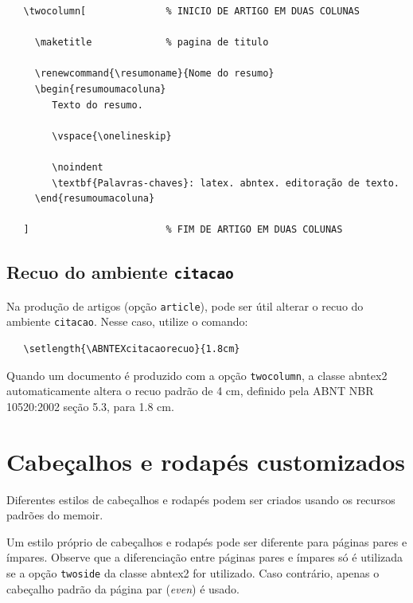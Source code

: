 \documentclass{Article_Class_RevInfor}
\begin{document}
\begin{verbatim}
   \twocolumn[              % INICIO DE ARTIGO EM DUAS COLUNAS

     \maketitle             % pagina de titulo

     \renewcommand{\resumoname}{Nome do resumo}
     \begin{resumoumacoluna}
        Texto do resumo.
      
        \vspace{\onelineskip}
 
        \noindent
        \textbf{Palavras-chaves}: latex. abntex. editoração de texto.
     \end{resumoumacoluna}
   
   ]                        % FIM DE ARTIGO EM DUAS COLUNAS
\end{verbatim}

\subsection{Recuo do ambiente \texttt{citacao}}

Na produção de artigos (opção \texttt{article}), pode ser útil alterar o recuo
do ambiente \texttt{citacao}. Nesse caso, utilize o comando:

\begin{verbatim}
   \setlength{\ABNTEXcitacaorecuo}{1.8cm}
\end{verbatim}

Quando um documento é produzido com a opção \texttt{twocolumn}, a classe
\textsf{abntex2} automaticamente altera o recuo padrão de 4 cm, definido pela
ABNT NBR 10520:2002 seção 5.3, para 1.8 cm.

\section{Cabeçalhos e rodapés customizados}

Diferentes estilos de cabeçalhos e rodapés podem ser criados usando os
recursos padrões do \textsf{memoir}.

Um estilo próprio de cabeçalhos e rodapés pode ser diferente para páginas pares
e ímpares. Observe que a diferenciação entre páginas pares e ímpares só é
utilizada se a opção \texttt{twoside} da classe \textsf{abntex2} for utilizado.
Caso contrário, apenas o cabeçalho padrão da página par (\emph{even}) é usado.
\end{document}
